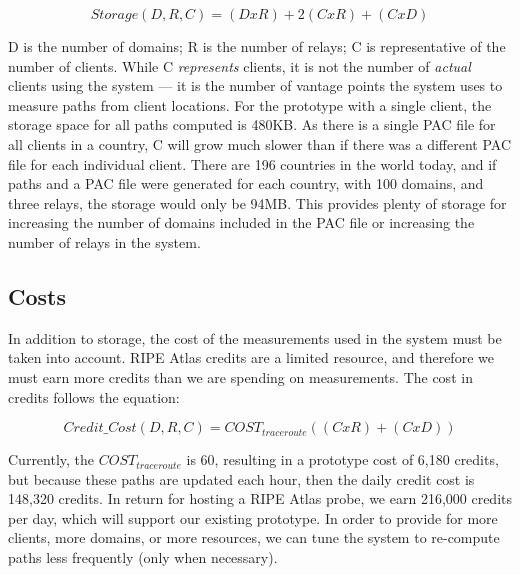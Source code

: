 \[Storage(D,R,C) = (D x R) + 2(C x R) + (C x D) \]

D is the number of domains; R is the number of relays; C is representative of the number of 
clients.  While C {\it represents} clients, it is not the number of {\it actual} clients using the 
system --- it is the number of vantage points the system uses to measure paths 
from client locations.  For the prototype with a single client, the storage space for all 
paths computed is 480KB.  As there is a single PAC file for all clients in 
a country, C will grow much slower than if there was a different PAC file for 
each individual client.  There are 196 countries in the world today, and if 
paths and a PAC file were generated for each country, with 100 domains, and 
three relays, the storage would only be 94MB.  This provides plenty of storage 
for increasing the number of domains included in the PAC file or increasing 
the number of relays in the system.

\subsection{Costs}
In addition to storage, the cost of the measurements used in the system must 
be taken into account.  RIPE Atlas credits are a limited resource, and therefore 
we must earn more credits than we are spending on measurements.  The cost 
in credits follows the equation:

\[Credit\_Cost(D,R,C) = COST_{traceroute}((C x R) + (C x D))\]

Currently, the $COST_{traceroute}$ is 60, resulting in a prototype cost of 6,180 
credits, but because these paths are updated each hour, then 
the daily credit cost is 148,320 credits.  In return for hosting a RIPE Atlas 
probe, we earn 216,000 credits per day, which will support our existing 
prototype.  In order to provide for more clients, more domains, or more 
resources, we can tune the system to re-compute paths less frequently (only when necessary).
